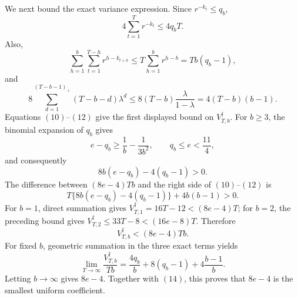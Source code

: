We next bound the exact variance expression. Since \(r^{-k_t}\le q_b\),
\[
4\sum_{t=1}^Tr^{-k_t}\le4q_bT.
\tag{10}
\]
Also,
\[
\sum_{h=1}^b\sum_{t=1}^{T-h}r^{h-k_{t+h}}
\le T\sum_{h=1}^br^{h-b}=Tb(q_b-1),
\tag{11}
\]
and
\[
8\sum_{d=1}^{(T-b-1)_+}(T-b-d)\lambda^d
\le8(T-b)\frac{\lambda}{1-\lambda}=4(T-b)(b-1).
\tag{12}
\]
Equations \((10)\)--\((12)\) give the first displayed bound on \(V_{T,b}^{\dagger}\). For \(b\ge3\), the binomial expansion of \(q_b\) gives
\[
e-q_b\ge\frac1b-\frac1{3b^2},\qquad q_b\le e<\frac{11}{4},
\]
and consequently
\[
8b(e-q_b)-4(q_b-1)>0.
\tag{13}
\]
The difference between \((8e-4)Tb\) and the right side of \((10)\)--\((12)\) is
\[
T\{8b(e-q_b)-4(q_b-1)\}+4b(b-1)>0.
\]
For \(b=1\), direct summation gives \(V_{T,1}^{\dagger}=16T-12<(8e-4)T\); for \(b=2\), the preceding bound gives \(V_{T,2}^{\dagger}\le33T-8<(16e-8)T\). Therefore
\[
V_{T,b}^{\dagger}< (8e-4)Tb.
\tag{14}
\]
For fixed \(b\), geometric summation in the three exact terms yields
\[
\lim_{T\to\infty}\frac{V_{T,b}^{\dagger}}{Tb}
=\frac{4q_b}{b}+8(q_b-1)+4\frac{b-1}{b}.
\]
Letting \(b\to\infty\) gives \(8e-4\). Together with \((14)\), this proves that \(8e-4\) is the smallest uniform coefficient.

